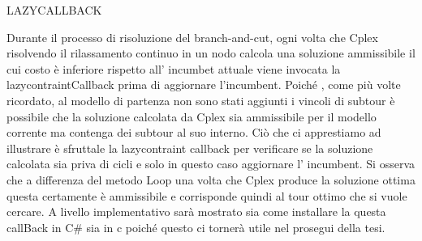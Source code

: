 \documentclass[11pt]{article}
\begin{document}
\vspace{2\baselineskip}
LAZYCALLBACK
\vspace{2\baselineskip}

Durante il processo di risoluzione del branch-and-cut, ogni volta che Cplex risolvendo il rilassamento continuo in un nodo calcola una soluzione ammissibile il cui costo \`e  inferiore rispetto all' incumbet attuale viene invocata la lazycontraintCallback prima di aggiornare l'incumbent. Poiché , come pi\`u volte ricordato, al modello di partenza non sono stati aggiunti i vincoli di subtour \`e possibile che la soluzione calcolata da Cplex sia ammissibile per il modello corrente ma contenga dei subtour al suo interno. Ciò che ci apprestiamo ad illustrare è sfruttale la lazycontraint callback per verificare se la soluzione calcolata sia priva di cicli e solo in questo caso aggiornare l' incumbent.
Si osserva che a differenza del metodo Loop una volta che Cplex produce la soluzione ottima questa certamente \`e  ammissibile e corrisponde quindi al tour ottimo che si vuole cercare.  
A livello implementativo sarà mostrato sia come installare la questa callBack in C\# sia in c poiché questo ci tornerà utile nel prosegui della tesi.
\end{document}
